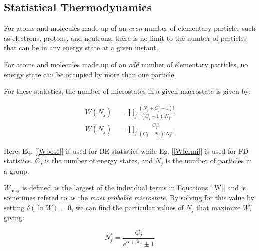 \documentclass[10pt]{article}
\begin{document}
\begin{flushleft}
\newpage
\section{Statistical Thermodynamics}
\label{sec:stat-thermo}

\begin{definition}
    For atoms and molecules made up of an \textit{even} number of elementary particles such as electrons, protons, and neutrons, there is no limit to the number of particles that can be in any energy state at a given instant.
\end{definition}

\begin{definition}
    For atoms and molecules made up of an \textit{odd} number of elementary particles, no energy state can be occupied by more than one particle.
\end{definition}

\begin{definition}[$W(N_j)$]

    For these statistics, the number of microstates in a given macrostate is given by:

    \begin{subequations}
        \begin{align}
            W(N_j) &= \prod_j \frac{(N_j + C_j - 1)!}{(C_j - 1)! N_j!} \label{Wbose}
            \\ W(N_j) &= \prod_j \frac{C_j!}{(C_j - N_j)! N_j!} \label{Wfermi}
        \end{align}
        \label{W}
    \end{subequations}

    Here, Eq. [\ref{Wbose}] is used for BE statistics while Eg. [\ref{Wfermi}] is used for FD statistics. $C_j$ is the number of energy states, and $N_j$ is the number of particles in a group.
    
\end{definition}

\begin{definition}

    $W_\text{max}$ is defined as the largest of the individual terms in Equations [\ref{W}] and is sometimes refered to as the \textit{most probable microstate}. By solving for this value by setting $\delta (\ln W) = 0$, we can find the particular values of $N_j$ that maximize $W$, giving:

    \begin{equation}
        N_j^* = \frac{C_j}{e^{\alpha + \beta \epsilon_j} \pm 1} \label{Nstar}
    \end{equation}


\end{definition}
\end{flushleft}
\end{document}
